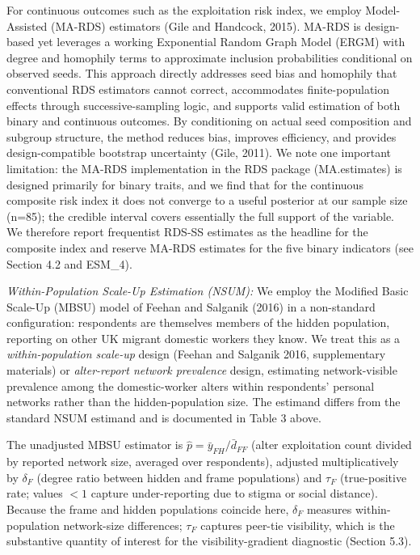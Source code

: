 \documentclass[
  12pt,
  letterpaper,
  DIV=11,
  numbers=noendperiod]{scrartcl}
\begin{document}
For continuous outcomes such as the exploitation risk index, we employ
Model-Assisted (MA-RDS) estimators (Gile and Handcock, 2015). MA-RDS is
design-based yet leverages a working Exponential Random Graph Model
(ERGM) with degree and homophily terms to approximate inclusion
probabilities conditional on observed seeds. This approach directly
addresses seed bias and homophily that conventional RDS estimators
cannot correct, accommodates finite-population effects through
successive-sampling logic, and supports valid estimation of both binary
and continuous outcomes. By conditioning on actual seed composition and
subgroup structure, the method reduces bias, improves efficiency, and
provides design-compatible bootstrap uncertainty (Gile, 2011). We note
one important limitation: the MA-RDS implementation in the RDS package
(MA.estimates) is designed primarily for binary traits, and we find that
for the continuous composite risk index it does not converge to a useful
posterior at our sample size (n=85); the credible interval covers
essentially the full support of the variable. We therefore report
frequentist RDS-SS estimates as the headline for the composite index and
reserve MA-RDS estimates for the five binary indicators (see Section 4.2
and ESM\_4).

\emph{Within-Population Scale-Up Estimation (NSUM):} We employ the
Modified Basic Scale-Up (MBSU) model of Feehan and Salganik (2016) in a
non-standard configuration: respondents are themselves members of the
hidden population, reporting on other UK migrant domestic workers they
know. We treat this as a \emph{within-population scale-up} design
(Feehan and Salganik 2016, supplementary materials) or
\emph{alter-report network prevalence} design, estimating
network-visible prevalence among the domestic-worker alters within
respondents' personal networks rather than the hidden-population size.
The estimand differs from the standard NSUM estimand and is documented
in Table 3 above.

The unadjusted MBSU estimator is
\(\hat{p} = \bar{y}_{FH} / \bar{d}_{FF}\) (alter exploitation count
divided by reported network size, averaged over respondents), adjusted
multiplicatively by \(\delta_F\) (degree ratio between hidden and frame
populations) and \(\tau_F\) (true-positive rate; values \(< 1\) capture
under-reporting due to stigma or social distance). Because the frame and
hidden populations coincide here, \(\delta_F\) measures
within-population network-size differences; \(\tau_F\) captures peer-tie
visibility, which is the substantive quantity of interest for the
visibility-gradient diagnostic (Section 5.3).
\end{document}
